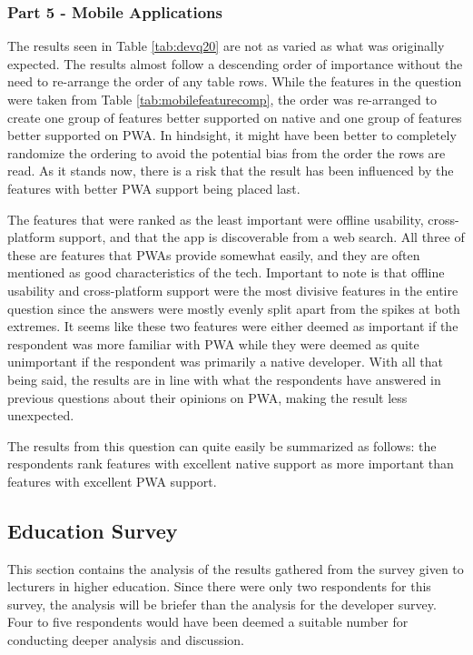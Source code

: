 \documentclass[a4paper,12pt]{article}
\begin{document}
\subsubsection{Part 5 - Mobile Applications}
\label{Analysis_devSurvey_part5}
The results seen in Table \ref{tab:devq20} are not as varied as what was originally expected. The results almost follow a descending order of importance without the need to re-arrange the order of any table rows. While the features in the question were taken from Table \ref{tab:mobilefeaturecomp}, the order was re-arranged to create one group of features better supported on native and one group of features better supported on PWA. In hindsight, it might have been better to completely randomize the ordering to avoid the potential bias from the order the rows are read. As it stands now, there is a risk that the result has been influenced by the features with better PWA support being placed last.

The features that were ranked as the least important were offline usability, cross-platform support, and that the app is discoverable from a web search. All three of these are features that PWAs provide somewhat easily, and they are often mentioned as good characteristics of the tech. Important to note is that offline usability and cross-platform support were the most divisive features in the entire question since the answers were mostly evenly split apart from the spikes at both extremes. It seems like these two features were either deemed as important if the respondent was more familiar with PWA while they were deemed as quite unimportant if the respondent was primarily a native developer. With all that being said, the results are in line with what the respondents have answered in previous questions about their opinions on PWA, making the result less unexpected.

The results from this question can quite easily be summarized as follows: the respondents rank features with excellent native support as more important than features with excellent PWA support.

\subsection{Education Survey}
\label{Analysis_eduSurvey}
This section contains the analysis of the results gathered from the survey given to lecturers in higher education. Since there were only two respondents for this survey, the analysis will be briefer than the analysis for the developer survey. Four to five respondents would have been deemed a suitable number for conducting deeper analysis and discussion.
\end{document}

